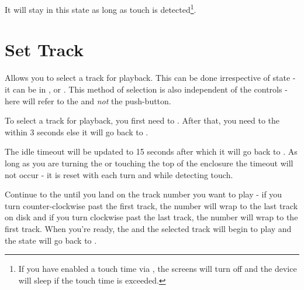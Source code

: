 It will stay in this state as long as touch is detected\footnote{ If you have
enabled a touch time via \hyperref[Power Settings]{}, the screens
will turn off and the device will sleep if the touch time is exceeded.}.

\section{Set Track} \label{Set Track} 

Allows you to select a track for playback. This can be done
irrespective of  state - it can be in ,  or
.  This method of selection is also independent of the 
controls -  here will refer to the  and \textit{not} the
 push-button.

\par\medskip

To select a track for playback, you first need to . After that, you
need to  the  within \num{3} seconds else it will go back to
.


The idle timeout will be updated to \num{15} seconds after which it will go back
to . As long as you are turning the  or touching the top of the
enclosure the timeout will not occur - it is reset with each turn and while
detecting touch.


Continue to  the  until you land on the track number you want
to play - if you turn counter-clockwise past the first track, the number will
wrap to the last track on disk and if you turn clockwise past the last track,
the number will wrap to the first track.  When you're ready,  the
 and the selected track will begin to play and the state will go back to
.


